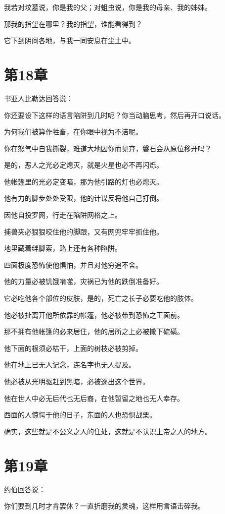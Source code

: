 \documentclass[12pt,oneside]{book}
\begin{document}
我若对坟墓说，你是我的父；对蛆虫说，你是我的母亲、我的姊妹。

那我的指望在哪里？我的指望，谁能看得到？

它下到阴间各地，与我一同安息在尘土中。


\chapter{第18章}
书亚人比勒达回答说：

你还要设下这样的语言陷阱到几时呢？你当动脑思考，然后再开口说话。

为何我们被算作牲畜，在你眼中视为不洁呢。

你在怒气中自我撕裂，难道大地因你而见弃，磐石会从原位移开吗？

是的，恶人之光必定熄灭，就是火星也必不再闪烁。

他帐篷里的光必定变暗，那为他引路的灯也必熄灭。

他有力的脚步处处受限，他的计谋反将他自己打倒。

因他自投罗网，行走在陷阱网格之上。

捕兽夹必狠狠咬住他的脚跟，又有网兜牢牢抓住他。

地里藏着绊脚索，路上还有各种陷阱。

四面极度恐怖使他惧怕，并且对他穷追不舍。

他的力量必被饥饿啃噬，灾祸已为他的跌倒准备好。

它必吃他各个部位的皮肤，是的，死亡之长子必要吃他的肢体。

他必被扯离开他所依靠的帐篷，他必被带到恐怖之王面前。

那不拥有他帐篷的必来居住，他的居所之上必被撒下硫磺。

他下面的根须必枯干，上面的树枝必被剪掉。

他在地上已无人记念，连名字也无人提及。

他必被从光明驱赶到黑暗，必被逐出这个世界。

他在世人中必无后代也无后裔，在他暂留之地也无人幸存。

西面的人惊愕于他的日子，东面的人也恐惧战栗。

确实，这些就是不公义之人的住处，这就是不认识上帝之人的地方。


\chapter{第19章}
约伯回答说：

你们要到几时才肯罢休？一直折磨我的灵魂，这样用言语击碎我。
\end{document}
